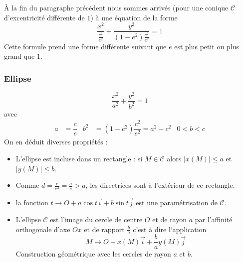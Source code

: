 \`A la fin du paragraphe précédent nous sommes arrivés (pour une conique $\mathcal C$ d'excentricité différente de $1$) à une équation de la forme
\begin{displaymath}
\dfrac{x^2}{\frac{c^2}{e^2}} + \dfrac{y^2}{(1-e^2)\frac{c^2}{e^2}} = 1
\end{displaymath}
Cette formule prend une forme différente suivant que $e$ est plus petit ou plus grand que 1.
\subsubsection{Ellipse}
\begin{displaymath}
\dfrac{x^2}{a^2} + \dfrac{y^2}{b^2} = 1
\end{displaymath}
avec 
\begin{align*}
 a &= \dfrac{c}{e} & b^2 &= (1-e^2)\dfrac{c^2}{e^2}=a^2 - c^2 & 0<b<c
\end{align*}
On en déduit diverses propriétés :
\begin{itemize}
 \item L'ellipse est incluse dans un rectangle : si $M\in \mathcal C$ alors $|x(M)|\leq a$ et $|y(M)|\leq b$.
\item Comme $d=\frac{c}{e^2}=\frac{a}{e}>a$, les directrices sont à l'extérieur de ce rectangle.
\item la fonction $t \rightarrow O +a\cos t \overrightarrow{i} + b\sin t \overrightarrow{j}$ est une paramétrisation de $\mathcal C$.
\item L'ellipse $\mathcal C$ est l'image du cercle de centre $O$ et de rayon $a$ par l'affinité orthogonale d'axe $Ox$ et de rapport $\frac{b}{a}$ c'est à dire l`application 
\begin{displaymath}
 M \rightarrow O +x(M)\overrightarrow{i} + \dfrac{b}{a}y(M)\overrightarrow{j}
\end{displaymath}
Construction géométrique avec les cercles de rayon $a$ et $b$.
\end{itemize}

